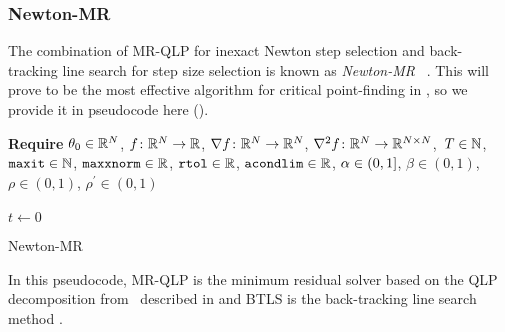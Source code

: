 \documentclass[../../thesis.tex]{subfiles}
\begin{document}
\subsubsection{Newton-MR}

The combination of MR-QLP
for inexact Newton step selection
and back-tracking line search
for step size selection
is known as \emph{Newton-MR}%
~\cite{roosta2018}.
This will prove to be the most effective
algorithm for critical point-finding in
,
so we provide it in pseudocode here
().
\\
\begin{algorithm}[h]
    \SetAlgoLined{}
    \textbf{Require}
    $\theta_0 \in \mathbb{R}^N$,
    $f\colon\mathbb{R}^N\to\mathbb{R}$,
    $\nabla{f}\colon\mathbb{R}^N\to\mathbb{R}^N$,
    $\nabla^2{f}\colon\mathbb{R}^N\to\mathbb{R}^{N\times N}$,\
    $T\in \mathbb{N}$,\\
    $\texttt{maxit} \in \mathbb{N}$,
    $\texttt{maxxnorm} \in \mathbb{R}$,
    $\texttt{rtol} \in \mathbb{R}$,
    $\texttt{acondlim} \in \mathbb{R}$,
    $\alpha \in \intervaloc{0}{1}$,
    $\beta \in (0, 1)$,
    $\rho \in (0, 1)$,
    $\rho^\prime \in (0, 1)$\\ \ \\
    $t \leftarrow 0$\\
    \caption{Newton-MR}

\end{algorithm}
\noindent In this pseudocode,
MR-QLP is the minimum residual solver
based on the QLP decomposition
from~\cite{choi2011}
described in  and
BTLS is the back-tracking line search method
.
\end{document}
